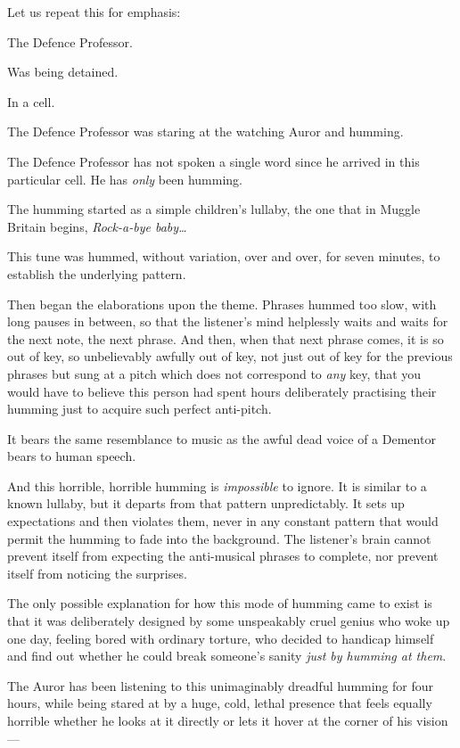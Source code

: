 Let us repeat this for emphasis:

The Defence Professor.

Was being detained.

In a cell.

The Defence Professor was staring at the watching Auror and humming.

The Defence Professor has not spoken a single word since he arrived in this particular cell. He has \emph{only} been humming.

The humming started as a simple children's lullaby, the one that in Muggle Britain begins, \emph{Rock-a-bye baby{\ldots}}

This tune was hummed, without variation, over and over, for seven minutes, to establish the underlying pattern.

Then began the elaborations upon the theme. Phrases hummed too slow, with long pauses in between, so that the listener's mind helplessly waits and waits for the next note, the next phrase. And then, when that next phrase comes, it is so out of key, so unbelievably awfully out of key, not just out of key for the previous phrases but sung at a pitch which does not correspond to \emph{any} key, that you would have to believe this person had spent hours deliberately practising their humming just to acquire such perfect anti-pitch.

It bears the same resemblance to music as the awful dead voice of a Dementor bears to human speech.

And this horrible, horrible humming is \emph{impossible} to ignore. It is similar to a known lullaby, but it departs from that pattern unpredictably. It sets up expectations and then violates them, never in any constant pattern that would permit the humming to fade into the background. The listener's brain cannot prevent itself from expecting the anti-musical phrases to complete, nor prevent itself from noticing the surprises.

The only possible explanation for how this mode of humming came to exist is that it was deliberately designed by some unspeakably cruel genius who woke up one day, feeling bored with ordinary torture, who decided to handicap himself and find out whether he could break someone's sanity \emph{just by humming at them}.

The Auror has been listening to this unimaginably dreadful humming for four hours, while being stared at by a huge, cold, lethal presence that feels equally horrible whether he looks at it directly or lets it hover at the corner of his vision—

